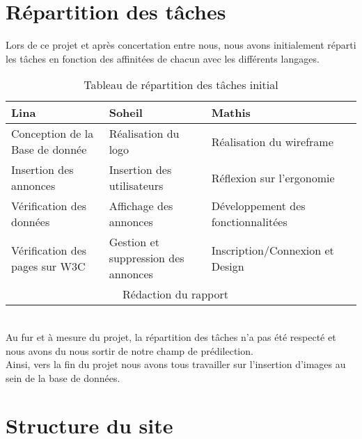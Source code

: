 \documentclass[11pt,a4paper]{article}
\begin{document}
\section{Répartition des tâches}
Lors de ce projet et après concertation entre nous, nous avons initialement réparti les tâches en fonction des affinitées de chacun avec les différents langages.
\begin{table}[h]
    \begin{center}
        \begin{tabularx}{16.3cm}{|p{5cm}|p{5cm}|p{5cm}|X|}
            \hline
            Lina & Soheil & Mathis \\
            \hline
            Conception de la Base de donnée & Réalisation du logo & Réalisation du wireframe \\
            Insertion des annonces & Insertion des utilisateurs & Réflexion sur l'ergonomie \\
            Vérification des données & Affichage des annonces & Développement des fonctionnalitées \\
            Vérification des pages sur W3C & Gestion et suppression des annonces & Inscription/Connexion et Design \\
            \hline
            \multicolumn{3}{|c|}{Rédaction du rapport} \\
        \hline
        \end{tabularx}
        \caption{Tableau de répartition des tâches initial}
    \end{center}
\end{table}
\\Au fur et à mesure du projet, la répartition des tâches n'a pas été respecté et nous avons du nous sortir de notre champ de prédilection.\\
Ainsi, vers la fin du projet nous avons tous travailler sur l'insertion d'images au sein de la base de données.
\section{Structure du site}
\end{document}
